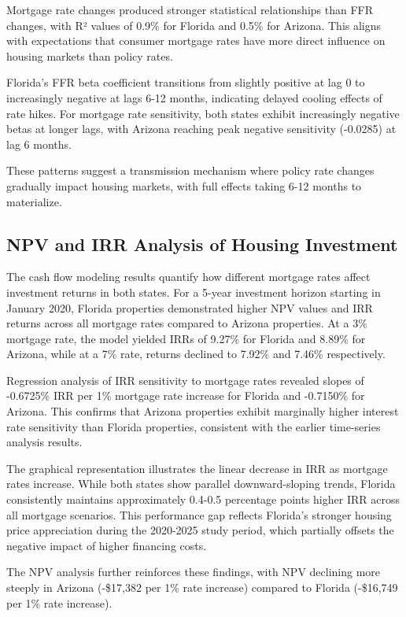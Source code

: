\documentclass[12pt, stu, abstract]{apa7}
\begin{document}
Mortgage rate changes produced stronger statistical relationships than FFR changes, with R² values of 0.9\% for Florida and 0.5\% for Arizona. This aligns with expectations that consumer mortgage rates have more direct influence on housing markets than policy rates.

Florida's FFR beta coefficient transitions from slightly positive at lag 0 to increasingly negative at lags 6-12 months, indicating delayed cooling effects of rate hikes. For mortgage rate sensitivity, both states exhibit increasingly negative betas at longer lags, with Arizona reaching peak negative sensitivity (-0.0285) at lag 6 months.

These patterns suggest a transmission mechanism where policy rate changes gradually impact housing markets, with full effects taking 6-12 months to materialize.

\subsection{NPV and IRR Analysis of Housing Investment}

The cash flow modeling results quantify how different mortgage rates affect investment returns in both states. For a 5-year investment horizon starting in January 2020, Florida properties demonstrated higher NPV values and IRR returns across all mortgage rates compared to Arizona properties. At a 3\% mortgage rate, the model yielded IRRs of 9.27\% for Florida and 8.89\% for Arizona, while at a 7\% rate, returns declined to 7.92\% and 7.46\% respectively.

Regression analysis of IRR sensitivity to mortgage rates revealed slopes of -0.6725\% IRR per 1\% mortgage rate increase for Florida and -0.7150\% for Arizona. This confirms that Arizona properties exhibit marginally higher interest rate sensitivity than Florida properties, consistent with the earlier time-series analysis results.

The graphical representation illustrates the linear decrease in IRR as mortgage rates increase. While both states show parallel downward-sloping trends, Florida consistently maintains approximately 0.4-0.5 percentage points higher IRR across all mortgage scenarios. This performance gap reflects Florida's stronger housing price appreciation during the 2020-2025 study period, which partially offsets the negative impact of higher financing costs.

The NPV analysis further reinforces these findings, with NPV declining more steeply in Arizona (-\$17,382 per 1\% rate increase) compared to Florida (-\$16,749 per 1\% rate increase).
\end{document}
